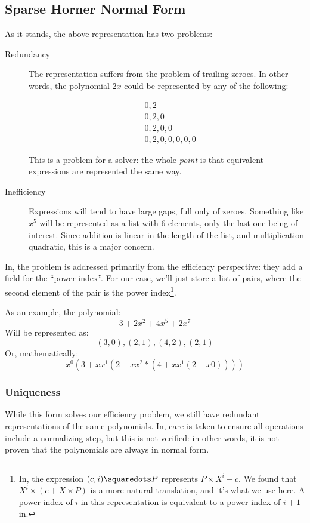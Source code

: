 \documentclass[draft, twocolumn]{article}
\begin{document}
\subsection{Sparse Horner Normal Form}
As it stands, the above representation has two problems:

\begin{description}
  \item[Redundancy] The representation suffers from the problem of trailing
    zeroes. In other words, the polynomial $2x$ could be represented by any of
    the following:
  
    \begin{align*}
      & 0, 2 \\
      & 0, 2, 0 \\
      & 0, 2, 0, 0 \\
      & 0, 2, 0, 0, 0, 0, 0
    \end{align*}
    
    This is a problem for a solver: the whole \emph{point} is that equivalent
    expressions are represented the same way.

  \item[Inefficiency] Expressions will tend to have large gaps, full only of
    zeroes. Something like $x^5$ will be represented as a list with 6 elements,
    only the last one being of interest. Since addition is linear in the length
    of the list, and multiplication quadratic, this is a major concern.
\end{description}

In\cite{hutchison_proving_2005}, the problem is addressed primarily from the
efficiency perspective: they add a field for the ``power index''. For our case,
we'll just store a list of pairs, where the second element of the pair is the
power index\footnote{
  In\cite{hutchison_proving_2005}, the expression \((c , i) \squaredots P\)
  represents \(P \times X^i + c\). We found that \(X^i \times (c + X \times P)\)
  is a more natural translation, and it's what we use here. A power index of
  \(i\) in this representation is equivalent to a power index of \(i+1\)
  in\cite{hutchison_proving_2005}.
}.

As an example, the polynomial:
\[ 3 + 2x^2 + 4x^5 + 2x^7 \]
Will be represented as:
\[ (3,0),(2,1),(4,2),(2,1) \]
Or, mathematically:
\[ x^0 (3 + x x^1 (2 + x x^2 * (4 + x x^1 (2 + x 0)))) \]
\subsubsection{Uniqueness}
While this form solves our efficiency problem, we still have redundant
representations of the same polynomials. In\cite{hutchison_proving_2005}, care
is taken to ensure all operations include a normalizing step, but this is not
verified: in other words, it is not proven that the polynomials are always in
normal form.
\end{document}
